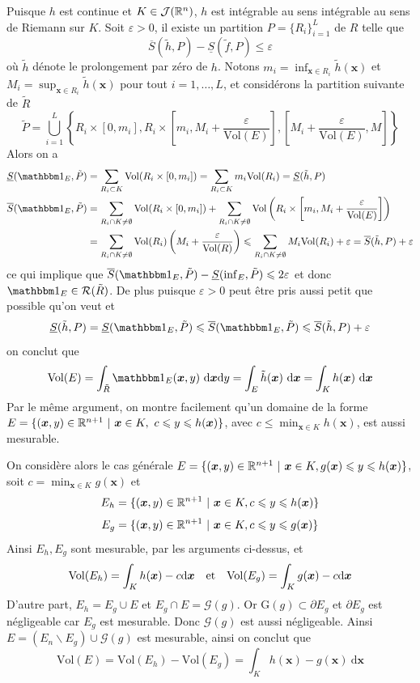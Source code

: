 {Puisque $h$ est continue et $K \in \mathcal J(\mathbb R^n)$, $h$ est intégrable au sens intégrable au sens de Riemann sur $K$. Soit $\varepsilon > 0$, il existe un partition  $P = \{R_i\}_{i=1}^L$ de $R$ telle que
\[
\overline S(\tilde h, P) - \underline S(\tilde f, P) \leqslant \varepsilon
\]
où $\tilde h$ dénote le prolongement par zéro de $h$. Notons $m_i = \inf_{\bm x \in R_i} \tilde h(\bm x)$ et $M_i = \sup_{\bm x \in R_i} \tilde h(\bm x)$ pour tout $i = 1, \ldots, L$, et considérons la partition suivante de $\tilde R$
\[
\tilde P = \bigcup_{i=1}^L \left\{ R_i \times [0, m_i], R_i \times \left[ m_i, M_i + \frac{\varepsilon}{\mathrm{Vol}(E)}\right], \left[M_i + \frac{\varepsilon}{\mathrm{Vol}(E)}, M\right]\right\}
\]
Alors on a
\begin{align*}
	\underline S(\ind_E, \tilde P) &= \sum_{R_i \subset K} \mathrm{Vol}(R_i \times [0, m_i]) = \sum_{R_i \subset K} m_i \mathrm{Vol}(R_i) = \underline S(\tilde h, P) \\
	\overline S(\ind_E, \tilde P) &= \sum_{R_i \cap K \neq \emptyset} \mathrm{Vol}(R_i \times [0, m_i]) + \sum_{R_i \cap K \neq \emptyset} \mathrm{Vol}\left(R_i \times \left[ m_i, M_i + \frac{\varepsilon}{\mathrm{Vol}(E)}\right]\right) \\
	&= \sum_{R_i \cap K \neq \emptyset } \mathrm{Vol}(R_i) \left(M_i + \frac{\varepsilon}{\mathrm{Vol}(R)} \right) \leqslant \sum_{R_i \cap K \neq \emptyset} M_i\mathrm{Vol}(R_i) + \varepsilon = \overline S(\tilde h, P) + \varepsilon
\end{align*}
ce qui implique que $\overline S(\ind_E, \tilde P) - \underline S(\inf_E, \tilde P) \leqslant 2 \varepsilon$ et donc $\ind_E\in \mathcal R(\tilde R)$. De plus puisque $\varepsilon > 0$ peut être pris aussi petit que possible qu'on veut et
\[
\underline S(\tilde h, P) = \underline S(\ind_E, \tilde P) \leqslant \overline S(\ind_E, \tilde P) \leqslant \overline S(\tilde h, P) + \varepsilon
\]
on conclut que
\[
\mathrm{Vol}(E) = \int_{\tilde R} \ind_E (\bm x, y) ~\mathrm d \bm x \mathrm d y = \int_E \tilde h(\bm x) ~\mathrm d \bm x = \int_K h(\bm x) ~\mathrm d \bm x
\]
Par le même argument, on montre facilement qu'un domaine de la forme $E = \{(\bm x, y) \in \mathbb R^{n+1} ~|~ \bm x \in K, ~ c \leqslant y \leqslant h(\bm x)\}$, avec $c \leqslant \min_{\bm x \in K} h(\bm x)$, est aussi mesurable.

On considère alors le cas générale $E = \{(\bm x, y) \in \mathbb R^{n+1} ~|~ \bm x \in K, g(\bm x) \leqslant y \leqslant h(\bm x)\}$, soit $c = \min_{\bm x \in K} g(\bm x)$ et 
\[
E_h = \{(\bm x, y) \in \mathbb R^{n+1} ~|~ \bm x \in K, c \leqslant y \leqslant h(\bm x)\}
\]
\[
E_g = \{(\bm x, y) \in \mathbb R^{n+1} ~|~ \bm x \in K, c \leqslant y \leqslant g(\bm x)\}
\]
Ainsi $E_h, E_g$ sont mesurable, par les arguments ci-dessus, et
\[
\mathrm{Vol}(E_h) = \int_K h(\bm x) - c \mathrm d \bm x \quad \text{et} \quad \mathrm{Vol}(E_g) = \int_K g(\bm x) - c \mathrm d \bm x
\]
D'autre part, $E_h = E_g \cup E$ et $E_g\cap E = \mathcal G(g)$. Or $\mathrm G(g) \subset \partial E_g$ et $\partial E_g$ est négligeable car $E_g$ est mesurable. Donc $\mathcal G(g)$ est aussi négligeable. Ainsi $E = (E_n \backslash E_g)\cup \mathcal G(g)$ est mesurable, ainsi on conclut que
\[
\mathrm{Vol} (E) = \mathrm{Vol}(E_h) - \mathrm{Vol}(E_g) = \int_K h(\bm x) - g(\bm x) ~\mathrm d \bm x
\]
}
